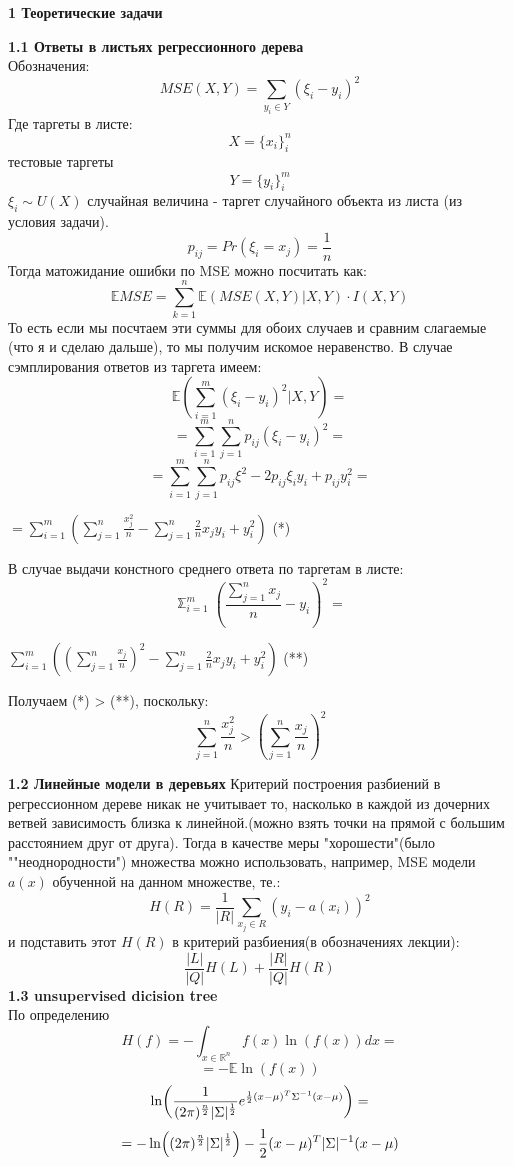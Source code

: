\documentclass[11pt,a4paper]{article}
\newcommand{\lnb}[1]{%
  \ln\mleft(#1\mright)%
}
\begin{document}
\begin{center}
\Huge {
\noindent
\textbf{1 Теоретические задачи}
}
\end{center}

\Large {
\textbf {1.1 Ответы в листьях регрессионного дерева}
}
\\
Обозначения:
$$ MSE(X, Y) = \sum_{y_i \in Y} (\xi_i - y_i)^2$$
Где таргеты в листе:
$$ X = \{x_i\}_i^n $$
тестовые таргеты
$$ Y = \{y_i\}_i^m $$
$\xi_i \sim U(X)$ случайная величина - таргет случайного объекта из листа (из условия задачи).
$$ p_{ij} = Pr(\xi_i = x_j) = \frac{1}{n}$$
Тогда матожидание ошибки по MSE можно посчитать как:
$$ \mathbb E MSE = \sum_{k=1}^n \mathbb{E} (MSE(X, Y)|X, Y) \cdot I(X, Y)$$
То есть если мы посчтаем эти суммы для обоих случаев и сравним слагаемые (что я и сделаю дальше), то мы получим искомое неравенство.
В случае сэмплирования ответов из таргета имеем:
\\
$$\mathbb{E}( \sum_{i=1}^m (\xi_i - y_i)^2| X, Y)=$$
$$ = \sum_{i=1}^m \sum_{j=1}^n p_{ij} (\xi_i - y_i)^2 =$$
$$ = \sum_{i=1}^m \sum_{j=1}^n p_{ij} \xi^2 - 2p_{ij} \xi_i y_i + p_{ij}y_i^2 = $$
\begin{center}
$ = \sum_{i=1}^m( \sum_{j=1}^n {\frac{x_j^2}{n}} - \sum_{j=1}^n \frac{2}{n} x_j y_i + y_i^2)$ (*)
\end{center}
В случае выдачи констного среднего ответа по таргетам в листе:
\\
$$ \mathbb \sum_{i=1}^m (\frac{\sum_{j=1}^n x_j}{n} - y_i)^2 = $$
\begin{center}
$ \sum_{i=1}^m ( (\sum_{j=1}^n \frac{x_j}{n})^2 - \sum_{j=1}^n \frac{2}{n} x_j y_i + y_i^2)$ (**)
\end{center}
Получаем (*) > (**), поскольку:
$$ \sum_{j=1}^n \frac{x_j^2}{n} > (\sum_{j=1}^n \frac{x_j}{n})^2 $$

\Large {
\textbf {1.2 Линейные модели в деревьях}
}
Критерий построения разбиений в регрессионном дереве никак не учитывает то, насколько в каждой из дочерних ветвей зависимость близка к линейной.(можно взять точки на прямой с большим расстоянием друг от друга).
Тогда в качестве меры "хорошести"(было ""неоднородности") множества можно использовать, например, MSE модели $a(x)$ обученной на данном множестве, те.:
$$ H(R) = \frac{1}{|R|} \sum_{x_j \in R}(y_i - a(x_i))^2 $$
и подставить этот $H(R)$ в критерий разбиения(в обозначениях лекции):
$$ \frac{|L|}{|Q|} H(L) + \frac{|R|}{|Q|} H(R) $$
\Large {
\textbf {1.3 unsupervised dicision tree}
}
\\
По определению $$H(f) = -\int_{x \in \mathbb{R}^n}^{} f(x) \ln(f(x))dx = $$
$$ = -\mathbb{E}\ln(f(x)) $$
$$ \lnb{\frac{1}{(2\pi)^{\frac{n}{2}} |\Sigma|^{\frac{1}{2}} } e^{ \frac{1}{2} (x - \mu)^T \Sigma^{-1} (x-\mu) }} = $$
$$ = -\lnb{(2\pi)^{\frac{n}{2}} |\Sigma|^{\frac{1}{2}}} - \frac{1}{2} (x - \mu)^T |\Sigma|^{-1} (x - \mu)$$
\end{document}
